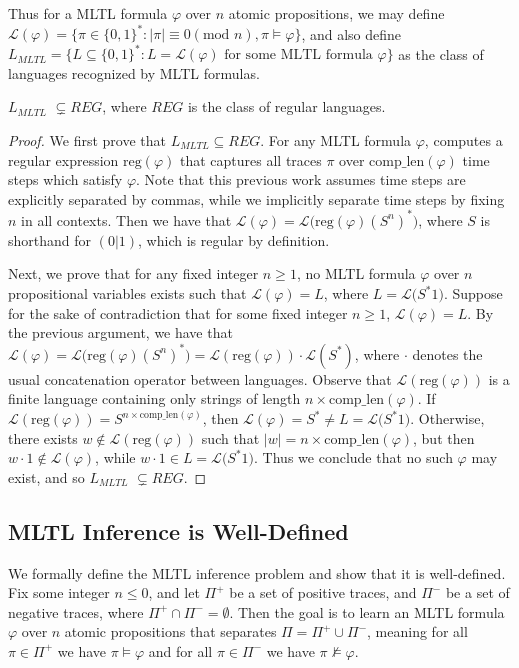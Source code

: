 \documentclass[runningheads]{llncs}
\renewcommand{\phi}{\varphi}
\begin{document}
Thus for a MLTL formula $\phi$ over $n$ atomic propositions, we may define \\
$\mathcal{L}(\phi) = \{\pi \in \{0, 1\}^* : |\pi| \equiv 0 (\text{mod }n), \pi \vDash \phi\}$, and also define \\
$L_{MLTL} = \{L \subseteq \{0, 1\}^* : L = \mathcal{L}(\phi) \text{ for some MLTL formula } \phi\}$ as the class of languages recognized by MLTL formulas.

\begin{theorem}
$L_{MLTL}$ $\subsetneq REG$, where $REG$ is the class of regular languages.
\end{theorem}
\begin{proof}
We first prove that $L_{MLTL} \subseteq REG$. 
For any MLTL formula $\phi$, \cite{Elwing_Gamboa-Guzman_Sorkin_Travesset_Wang_Rozier_2024} computes a regular expression $\text{reg}(\phi)$ that captures all traces $\pi$ over $\text{comp\_len}(\phi)$ time steps which satisfy $\phi$. 
Note that this previous work assumes time steps are explicitly separated by commas, while we implicitly separate time steps by fixing $n$ in all contexts. 
Then we have that $\mathcal{L}(\phi) = \mathcal{L}\big(\text{reg}(\phi) (S^n)^*\big)$, where $S$ is shorthand for $(0 | 1)$, which is regular by definition. 

Next, we prove that for any fixed integer $n \geq 1$, no MLTL formula $\phi$ over $n$ propositional variables exists such that $\mathcal{L}(\phi) = L$, where $L = \mathcal{L}\big(S^* 1 \big)$. Suppose for the sake of contradiction that for some fixed integer $n \geq 1$, $\mathcal{L}(\phi) = L$. By the previous argument, we have that $\mathcal{L}(\phi) = \mathcal{L}\big(\text{reg}(\phi) (S^n)^*\big) = \mathcal{L}(\text{reg}(\phi)) \cdot \mathcal{L}(S^*)$, where $\cdot$ denotes the usual concatenation operator between languages. Observe that $\mathcal{L}(\text{reg}(\phi))$ is a finite language containing only strings of length $n\times\text{comp\_len}(\phi)$. If $\mathcal{L}(\text{reg}(\phi)) = S^{n\times\text{comp\_len}(\phi)}$, then $\mathcal{L}(\phi) = S^* \neq L = \mathcal{L}\big(S^* 1 \big)$. Otherwise, there exists $w \notin \mathcal{L}(\text{reg}(\phi))$ such that $|w| = n\times\text{comp\_len}(\phi)$, but then $w\cdot1 \notin \mathcal{L}(\phi)$, while $w\cdot1 \in L = \mathcal{L}\big(S^* 1 \big)$. Thus we conclude that no such $\phi$ may exist, and so $L_{MLTL}$ $\subsetneq REG$.
\end{proof}

\subsection{MLTL Inference is Well-Defined}
We formally define the MLTL inference problem and show that it is well-defined. Fix some integer $n \leq 0$, and let $\Pi^+$ be a set of positive traces, and $\Pi^-$ be a set of negative traces, where $\Pi^+ \cap \Pi^- = \emptyset$. Then the goal is to learn an MLTL formula $\phi$ over $n$ atomic propositions that separates $\Pi = \Pi^+ \cup \Pi^-$, meaning for all $\pi \in \Pi^+$ we have $\pi \vDash \phi$ and for all $\pi \in \Pi^-$ we have $\pi \nvDash \phi$.
\end{document}
